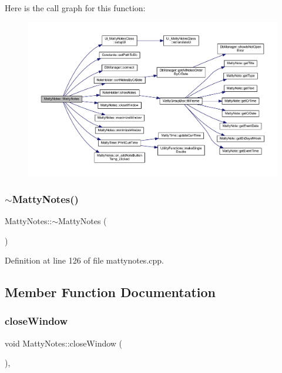 Here is the call graph for this function\+:
\nopagebreak
\begin{figure}[H]
\begin{center}
\leavevmode
\includegraphics[width=350pt]{classMattyNotes_aa81db851f82183700abb0b7cd1ba2299_cgraph}
\end{center}
\end{figure}
\hypertarget{classMattyNotes_aff7466ee8047ed0293c62df37d245906}{}\label{classMattyNotes_aff7466ee8047ed0293c62df37d245906} 
\subsubsection{\texorpdfstring{$\sim$\+Matty\+Notes()}{~MattyNotes()}}
{\footnotesize\ttfamily Matty\+Notes\+::$\sim$\+Matty\+Notes (\begin{DoxyParamCaption}{ }\end{DoxyParamCaption})}



Definition at line 126 of file mattynotes.\+cpp.



\subsection{Member Function Documentation}
\hypertarget{classMattyNotes_a63c0d10781a0acc57387682282aded37}{}\label{classMattyNotes_a63c0d10781a0acc57387682282aded37} 
\subsubsection{\texorpdfstring{close\+Window}{closeWindow}}
{\footnotesize\ttfamily void Matty\+Notes\+::close\+Window (\begin{DoxyParamCaption}{ }\end{DoxyParamCaption})\hspace{0.3cm}{\ttfamily [private]}, {\ttfamily [slot]}}




